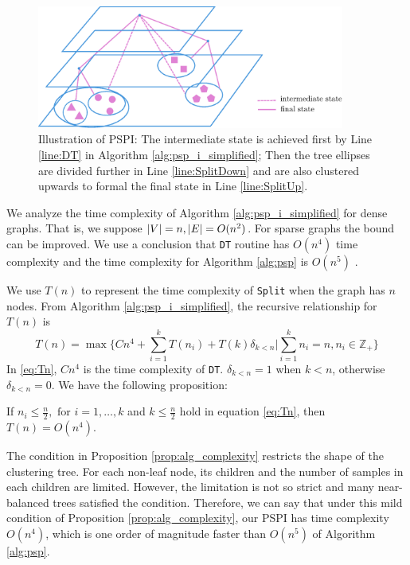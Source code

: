 \begin{figure}
\centering
\includegraphics[width=0.9\textwidth]{improved_alg.eps}
\caption{Illustration of PSPI: The intermediate state is achieved first by Line \ref{line:DT} in Algorithm \ref{alg:psp_i_simplified};
Then the tree ellipses are divided further in Line \ref{line:SplitDown} and are also clustered upwards to formal the final state in Line \ref{line:SplitUp}.}\label{fig:pspi}
\end{figure}

We analyze the time complexity of Algorithm \ref{alg:psp_i_simplified} for dense graphs. That is, we suppose $\lvert V\rvert = n, \lvert E\rvert = O(n^2)$. For sparse graphs the bound can be improved. We use a conclusion that \texttt{DT} routine has $O(n^4)$ time complexity and the time complexity for Algorithm \ref{alg:psp} is $O(n^5)$ \citep{pin}.

We use $T(n)$ to represent the time complexity of \texttt{Split} when the graph has $n$ nodes.
From Algorithm \ref{alg:psp_i_simplified}, the recursive relationship for $T(n)$ is
\begin{equation}\label{eq:Tn}
T(n) = \max \{ C n^4 + \sum_{i=1}^k T(n_i) + T(k)\delta_{k<n} | \sum_{i=1}^k n_i = n, n_i \in \mathbb{Z}_{+} \}
\end{equation}	
In \eqref{eq:Tn}, $Cn^4$ is the time complexity of \texttt{DT}. $\delta_{k<n} = 1$ when $k<n$, otherwise $\delta_{k<n}=0$. We have the following proposition:
\begin{proposition}\label{prop:alg_complexity}
	 If $n_i \leq \frac{n}{2}, \textrm{ for } i=1,\dots,k$ and $ k \leq \frac{n}{2}$  hold in equation \eqref{eq:Tn}, then $T(n) = O(n^4)$.
\end{proposition}

The condition in Proposition \ref{prop:alg_complexity} restricts the shape of the clustering tree. For each non-leaf node, its children and the number of samples in each children are limited. However, the limitation is not so strict and
many near-balanced trees satisfied the condition. Therefore, we can say that under this mild condition of Proposition \ref{prop:alg_complexity},
our PSPI has time complexity $O(n^4)$, which is one order of magnitude faster than $O(n^5)$ of Algorithm \ref{alg:psp}.

